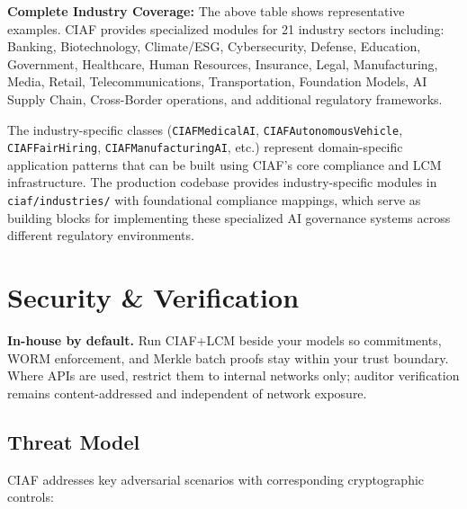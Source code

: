 \documentclass[12pt,a4paper]{article}
\begin{document}
\begin{infobox}
\textbf{Complete Industry Coverage:} The above table shows representative examples. CIAF provides specialized modules for 21 industry sectors including: Banking, Biotechnology, Climate/ESG, Cybersecurity, Defense, Education, Government, Healthcare, Human Resources, Insurance, Legal, Manufacturing, Media, Retail, Telecommunications, Transportation, Foundation Models, AI Supply Chain, Cross-Border operations, and additional regulatory frameworks.
\end{infobox}

\begin{tcolorbox}[colframe=blue!70, colback=green!8, title={\textbf{Implementation Note}}]
The industry-specific classes (\texttt{CIAFMedicalAI}, \texttt{CIAFAutonomousVehicle}, \texttt{CIAFFairHiring}, \texttt{CIAFManufacturingAI}, etc.) represent domain-specific application patterns that can be built using CIAF's core compliance and LCM infrastructure. The production codebase provides industry-specific modules in \texttt{ciaf/industries/} with foundational compliance mappings, which serve as building blocks for implementing these specialized AI governance systems across different regulatory environments.
\end{tcolorbox}

\section{Security \& Verification}

\begin{technicalbox}
\textbf{In-house by default.} Run CIAF+LCM beside your models so commitments, WORM enforcement, and Merkle batch proofs stay within your trust boundary. Where APIs are used, restrict them to internal networks only; auditor verification remains content-addressed and independent of network exposure.
\end{technicalbox}

\subsection{Threat Model}

CIAF addresses key adversarial scenarios with corresponding cryptographic controls:
\end{document}
